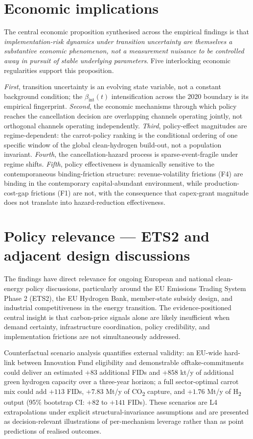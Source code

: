 \documentclass[11pt,a4paper]{article}
\newcommand{\bint}{\beta_{\text{int}}}
\begin{document}
\section*{Economic implications}

The central economic proposition synthesised across the empirical findings is that \emph{implementation-risk dynamics under transition uncertainty are themselves a substantive economic phenomenon, not a measurement nuisance to be controlled away in pursuit of stable underlying parameters}. Five interlocking economic regularities support this proposition.

\emph{First}, transition uncertainty is an evolving state variable, not a constant background condition; the $\bint(t)$ intensification across the 2020 boundary is its empirical fingerprint. \emph{Second}, the economic mechanisms through which policy reaches the cancellation decision are overlapping channels operating jointly, not orthogonal channels operating independently. \emph{Third}, policy-effect magnitudes are regime-dependent: the carrot-policy ranking is the conditional ordering of one specific window of the global clean-hydrogen build-out, not a population invariant. \emph{Fourth}, the cancellation-hazard process is sparse-event-fragile under regime shifts. \emph{Fifth}, policy effectiveness is dynamically sensitive to the contemporaneous binding-friction structure: revenue-volatility frictions (F4) are binding in the contemporary capital-abundant environment, while production-cost-gap frictions (F1) are not, with the consequence that capex-grant magnitude does not translate into hazard-reduction effectiveness.

\section*{Policy relevance --- ETS2 and adjacent design discussions}

The findings have direct relevance for ongoing European and national clean-energy policy discussions, particularly around the EU Emissions Trading System Phase 2 (ETS2), the EU Hydrogen Bank, member-state subsidy design, and industrial competitiveness in the energy transition. The evidence-positioned central insight is that carbon-price signals alone are likely insufficient when demand certainty, infrastructure coordination, policy credibility, and implementation frictions are not simultaneously addressed.

Counterfactual scenario analysis quantifies external validity: an EU-wide hard-link between Innovation Fund eligibility and demonstrable offtake-commitments could deliver an estimated $+83$ additional FIDs and $+858$ kt/y of additional green hydrogen capacity over a three-year horizon; a full sector-optimal carrot mix could add $+113$ FIDs, $+7.83$ Mt/y of CO\textsubscript{2} capture, and $+1.76$ Mt/y of H\textsubscript{2} output (95\% bootstrap CI: $+82$ to $+141$ FIDs). These scenarios are L4 extrapolations under explicit structural-invariance assumptions and are presented as decision-relevant illustrations of per-mechanism leverage rather than as point predictions of realised outcomes.
\end{document}
